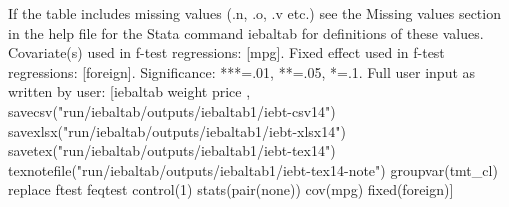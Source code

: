 If the table includes missing values (.n, .o, .v etc.) see the Missing values section in the help file for the Stata command iebaltab for definitions of these values. Covariate(s) used in f-test regressions: [mpg]. Fixed effect used in f-test regressions: [foreign]. Significance: ***=.01, **=.05, *=.1. Full user input as written by user: [iebaltab weight price , savecsv("run/iebaltab/outputs/iebaltab1/iebt-csv14") savexlsx("run/iebaltab/outputs/iebaltab1/iebt-xlsx14") savetex("run/iebaltab/outputs/iebaltab1/iebt-tex14") texnotefile("run/iebaltab/outputs/iebaltab1/iebt-tex14-note") groupvar(tmt\_cl) replace ftest feqtest control(1) stats(pair(none)) cov(mpg) fixed(foreign)] 
